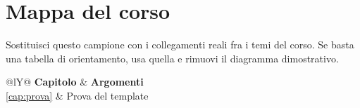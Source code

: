 \chapter*{Mappa del corso}
\gdef\ultimocapitolo{Mappa del corso}\gdef\ultimasezione{}

Sostituisci questo campione con i collegamenti reali fra i temi del corso. Se basta una tabella di orientamento, usa quella e rimuovi il diagramma dimostrativo.

\begin{schema}
\centering
{}
\end{schema}

\begin{center}
\begin{tabularx}{\linewidth}{@{}lY@{}}
\toprule
\textbf{Capitolo} & \textbf{Argomenti} \\
\midrule
\ref{cap:prova} & Prova del template \\
\bottomrule
\end{tabularx}
\end{center}
